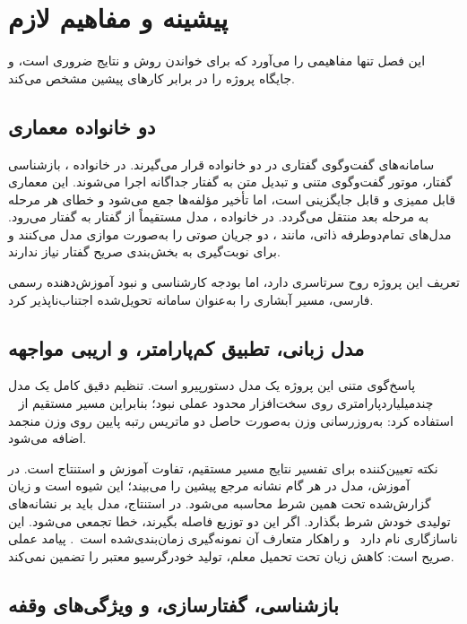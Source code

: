 \chapter{پیشینه و مفاهیم لازم}
\label{ch:background}

این فصل تنها مفاهیمی را می‌آورد که برای خواندن روش و نتایج ضروری است، و
جایگاه پروژه را در برابر کارهای پیشین مشخص می‌کند.

\section{دو خانواده معماری}

سامانه‌های گفت‌وگوی گفتاری در دو خانواده قرار می‌گیرند. در خانواده
، بازشناسی گفتار، موتور گفت‌وگوی متنی و تبدیل متن به گفتار
جداگانه اجرا می‌شوند. این معماری قابل ممیزی و قابل جایگزینی است، اما تأخیر
مؤلفه‌ها جمع می‌شود و خطای هر مرحله به مرحله بعد منتقل می‌گردد. در خانواده
، مدل مستقیماً از گفتار به گفتار می‌رود. مدل‌های تمام‌دوطرفه
ذاتی، مانند ، دو جریان صوتی را به‌صورت موازی مدل می‌کنند و برای
نوبت‌گیری به بخش‌بندی صریح گفتار نیاز ندارند.

تعریف این پروژه روح سرتاسری دارد، اما بودجه کارشناسی و نبود آموزش‌دهنده
رسمی فارسی، مسیر آبشاری را به‌عنوان سامانه تحویل‌شده اجتناب‌ناپذیر کرد.

\section{مدل زبانی، تطبیق کم‌پارامتر، و اریبی مواجهه}

پاسخ‌گوی متنی این پروژه یک مدل دستور‌پیرو است. تنظیم دقیق کامل یک مدل
چند‌میلیارد‌پارامتری روی سخت‌افزار محدود عملی نبود؛ بنابراین مسیر مستقیم از
~\cite{hu2022lora} استفاده کرد: به‌روزرسانی وزن به‌صورت حاصل دو
ماتریس رتبه پایین روی وزن منجمد اضافه می‌شود.

نکته تعیین‌کننده برای تفسیر نتایج مسیر مستقیم، تفاوت آموزش و استنتاج است.
در آموزش، مدل در هر گام نشانه مرجع پیشین را می‌بیند؛ این شیوه  است و زیان گزارش‌شده تحت همین شرط محاسبه می‌شود. در استنتاج، مدل
باید بر نشانه‌های تولیدی خودش شرط بگذارد. اگر این دو توزیع فاصله بگیرند،
خطا تجمعی می‌شود. این ناسازگاری  نام دارد~\cite{ranzato2016scheduledsampling}
و راهکار متعارف آن نمونه‌گیری
زمان‌بندی‌شده است~\cite{bengio2015scheduledsampling}. پیامد عملی صریح است:
کاهش زیان تحت تحمیل معلم، تولید خودرگرسیو معتبر را تضمین نمی‌کند.

\section{بازشناسی، گفتارسازی، و ویژگی‌های وقفه}

